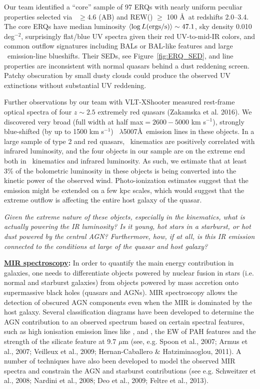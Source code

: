 \vspace{-22pt}
\noindent
Our team identified a ``core'' sample of 97 ERQs with nearly uniform
peculiar properties selected via \imw\ $\ge 4.6$ (AB) and REW(\civ )
$\ge$ 100 \AA\ at redshifts 2.0--3.4.  The core ERQs have median
luminosity $\left<\log L ({\rm ergs/s})\right> \sim 47.1$, sky density
0.010 deg$^{-2}$, surprisingly flat/blue UV spectra given their red
UV-to-mid-IR colors, and common outflow signatures including BALs or
BAL-like features and large \civ\ emission-line blueshifts. Their
SEDs, see Figure~\ref{fig:ERQ_SED}, and line properties are
inconsistent with normal quasars behind a dust reddening
screen. Patchy obscuration by small dusty clouds could produce the
observed UV extinctions without substantial UV reddening.


\smallskip
\smallskip
\noindent
Further observations by our team with VLT-XShooter measured rest-frame
optical spectra of four $z\sim 2.5$ extremely red quasars (Zakamska et al. 2016).  
We discovered very broad (full width at half max$= 2600-5000$ km
s$^{-1}$), strongly blue-shifted (by up to 1500 km s$^{-1}$)
\oiii\ $\lambda$5007\AA\ emission lines in these objects. In a large
sample of type 2 and red quasars, \oiii\ kinematics are positively
correlated with infrared luminosity, and the four objects in our
sample are on the extreme end both in \oiii\ kinematics and infrared
luminosity.
As such, we estimate that at least 3\% of the bolometric luminosity in
these objects is being converted into the kinetic power of the
observed wind. Photo-ionization estimates suggest that the \oiii
emission might be extended on a few kpc scales, which would suggest
that the extreme outflow is affecting the entire host galaxy of the
quasar.

\smallskip
\smallskip
\noindent
{\it Given the extreme nature of these objects, especially in the 
kinematics,  what is actually powering the IR luminosity? 
Is it young, hot stars in a starburst, or hot dust powered by the central AGN?
Furthermore, how, if at all, is this IR emission connected to the
conditions at large of the quasar and host galaxy?}

\smallskip
\smallskip
\noindent
{\bf \underline{MIR spectroscopy}:}
In order to quantify the main energy contribution in galaxies, one
needs to differentiate objects powered by nuclear fusion in stars
(i.e. normal and starburst galaxies) from objects powered by mass
accretion onto supermassive black holes (quasars and AGNs). 
MIR spectroscopy allows the detection of obscured AGN components even
when the MIR is dominated by the host galaxy. Several classification
diagrams have been developed to determine the AGN contribution to an
observed spectrum based on certain spectral features, such as high
ionisation emission lines like \nev, \neii and \oiv, the EW of PAH
features and the strength of the silicate feature at 9.7 $\mu$m (see,
e.g. Spoon et al., 2007; Armus et al., 2007; Veilleux et al., 2009;
Hernan-Caballero \& Hatziminaoglou, 2011). A number of techniques have
also been developed to model the observed MIR spectra and constrain
the AGN and starburst contributions (see e.g. Schweitzer et al., 2008;
Nardini et al., 2008; Deo et al., 2009; Feltre et al., 2013).

